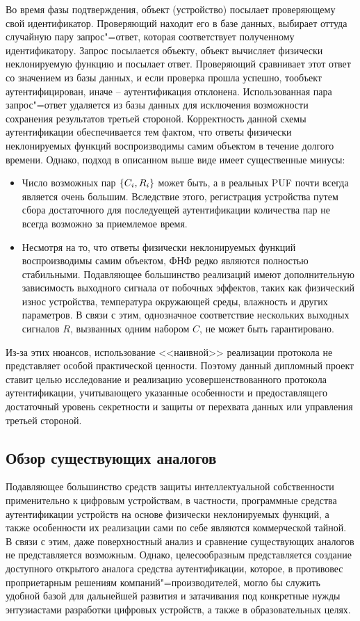 Во время фазы подтверждения, объект (устройство) посылает проверяющему свой идентификатор. Проверяющий находит его в базе данных, выбирает оттуда случайную пару запрос"=ответ, которая соответствует полученному идентификатору. Запрос посылается объекту, объект вычисляет физически неклонируемую функцию и посылает ответ. Проверяющий сравнивает этот ответ со значением из базы данных, и если проверка прошла успешно, тообъект аутентифицирован, иначе -- аутентификация отклонена. Использованная пара запрос"=ответ удаляется из базы данных для исключения возможности сохранения результатов третьей стороной. Корректность данной схемы аутентификации обеспечивается тем фактом, что ответы физически неклонируемых функций воспроизводимы самим объектом в течение долгого времени.
Однако, подход в описанном выше виде имеет существенные минусы:
\begin{itemize}
  \item Число возможных пар $ \left\{C_i, R_i\right\} $ может быть, а в реальных PUF почти всегда является очень большим. Вследствие этого, регистрация устройства путем сбора достаточного для последуещей аутентификации количества пар не всегда возможно за приемлемое время.
  \item Несмотря на то, что ответы физически неклонируемых функций воспроизводимы самим объектом, ФНФ редко являются полностью стабильными. Подавляющее большинство реализаций имеют дополнительную зависимость выходного сигнала от побочных эффектов, таких как физический износ устройства, температура окружающей среды, влажность и других параметров. В связи с этим, однозначное соответствие нескольких выходных сигналов $ R $, вызванных одним набором $ C $, не может быть гарантировано.
\end{itemize}

Из-за этих нюансов, использование <<наивной>> реализации протокола не представляет особой практической ценности. Поэтому данный дипломный проект ставит целью исследование и реализацию усовершенствованного протокола аутентификации, учитывающего указанные особенности и предоставлящего достаточный уровень секретности и защиты от перехвата данных или управления третьей стороной.


\subsection{Обзор существующих аналогов}
Подавляющее большинство средств защиты интеллектуальной собственности применительно к цифровым устройствам, в частности, программные средства аутентификации устройств на основе физически неклонируемых функций, а также особенности их реализации сами по себе являются коммерческой тайной. В связи с этим, даже поверхностный анализ и сравнение существующих аналогов не представляется возможным. Однако, целесообразным представляется создание доступного открытого аналога средства аутентификации, которое, в противовес проприетарным решениям компаний"=производителей, могло бы служить удобной базой для дальнейшей развития и затачивания под конкретные нужды энтузиастами разработки цифровых устройств, а также в образовательных целях.


